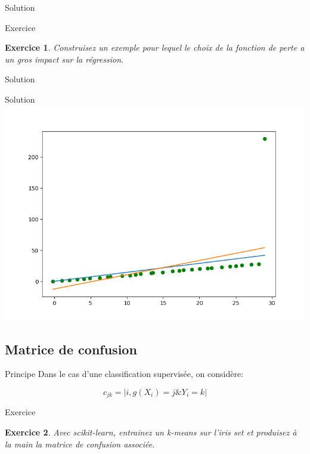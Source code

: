 \documentclass[11pt]{beamer}
\newtheorem{exercice}{Exercice}
\newcommand{\Pythonsmall}[1]{
	{\scriptsize }
}
\begin{document}
\begin{frame}{Solution}
\Pythonsmall{ext1}
\end{frame}

\begin{frame}{Exercice}
\begin{exercice}
Construisez un exemple pour lequel le choix de la fonction de perte a un gros impact sur la régression.
\end{exercice}
\end{frame}

\begin{frame}{Solution}
\Pythonsmall{ext2}
\end{frame}

\begin{frame}{Solution}
\includegraphics[scale=0.4]{ext2}
\end{frame}


\subsection{Matrice de confusion}

\begin{frame}{Principe}
Dans le cas d'une classification supervisée, on considère:

$$c_{jk} = |i,g(X_i)=j \& Y_i=k|$$
\end{frame}

\begin{frame}{Exercice}
\begin{exercice}
Avec scikit-learn, entrainez un k-means sur l'iris set et produisez à la main la matrice de confusion associée. 
\end{exercice}

\end{frame}
\end{document}
